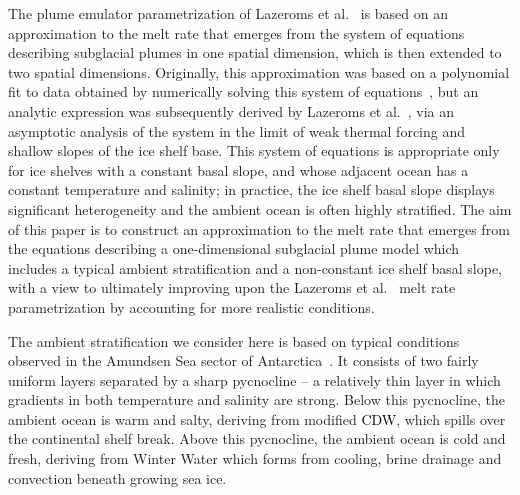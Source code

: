\documentclass[openacc]{rsproca_new}%
\newcommand{\red}[1]{{\color{red} #1}}
\newcommand{\blue}[1]{{\color{blue} #1}}
\newcommand{\rout}[1]{\red{\st{#1}}}\newcommand{\ab}[1]{\textcolor{Green}{#1}}\newcommand{\about}[1]{\textcolor{Cyan}{\sout{#1}}}
\renewcommand{\rout}[1]{{}} %
\renewcommand{\blue}[1]{{\textcolor{black}{#1}}} %
\renewcommand{\red}[1]{{}} %
\begin{document}
The plume emulator parametrization of Lazeroms et al.~\cite{Lazeroms2018TheCryo} is based on an approximation to the melt rate that emerges from the system of equations describing subglacial plumes in one spatial dimension, which is then extended to two spatial dimensions. Originally, this approximation was based on a polynomial fit to data obtained by numerically solving this system of equations~\cite{Jenkins2014scaling}, but an analytic expression was subsequently derived by Lazeroms et al.~\cite{Lazeroms2019JPhysOcean}, via an asymptotic analysis of the system in the limit of weak thermal forcing and shallow slopes of the ice shelf base. This system of equations \rout{are }\blue{is} appropriate only for ice shelves with a constant basal slope, and whose adjacent ocean has a constant temperature and salinity; in practice, the ice shelf basal slope displays significant heterogeneity and the ambient ocean is often highly stratified. The aim of this paper is to construct an approximation to the melt rate that emerges from the equations describing a one-dimensional subglacial plume model which includes a typical ambient stratification and a non-constant ice shelf basal slope, with a view to ultimately improving upon the Lazeroms et al.~\cite{Lazeroms2018TheCryo} melt rate parametrization by accounting for more realistic conditions.

The ambient stratification we consider here is based on typical conditions observed in the Amundsen Sea sector of Antarctica~\cite{Jenkins2018NatureGeo}. It consists of two fairly uniform layers separated by a sharp pycnocline -- a relatively thin layer in which gradients in both temperature and salinity are strong. Below this pycnocline, the ambient ocean is warm and salty, deriving from modified \rout{Circumpolar Deep Water}\blue{CDW}, which spills over the continental shelf break. Above this pycnocline, the ambient ocean is cold and fresh, deriving from Winter Water which forms from cooling, brine drainage and convection beneath growing sea ice.
\end{document}
